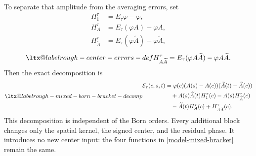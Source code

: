 \documentclass[a4paper,11pt]{article}
\makeatletter
\newcommand{\aliaslabel}[1]{\ltx@label{#1}}
\theoremstyle{plain}
\theoremstyle{definition}
\theoremstyle{remark}
\makeatother
\begin{document}
To separate that amplitude from the averaging errors, set
\begin{equation}\label{model-errors-def}
 \begin{aligned}
 H_1^\tau&=E_\tau\varphi-\varphi,\\
 H_A^\tau&=E_\tau(\varphi A)-\varphi A,\\
 H_{\widetilde A}^\tau&=E_\tau(\varphi\widetilde A)-\varphi\widetilde A,
 \end{aligned}
\end{equation}
\begin{equation}\label{model-product-error-def}\aliaslabel{rough-center-errors-def}
 H_{A\widetilde A}^\tau
 =E_\tau(\varphi A\widetilde A)-\varphi A\widetilde A.
\end{equation}
Then the exact decomposition is
\begin{equation}\label{model-mixed-bracket-decomp}\aliaslabel{rough-mixed-born-bracket-decomp}
\begin{aligned}
 \mathcal E_\tau(c,s,t)
 &=\varphi(c)(A(s)-A(c))(\widetilde A(t)-\widetilde A(c))\\
 &\quad+A(s)\widetilde A(t)H_1^\tau(c)
   -A(s)H_{\widetilde A}^\tau(c)\\
 &\quad-\widetilde A(t)H_A^\tau(c)+H_{A\widetilde A}^\tau(c).
\end{aligned}
\end{equation}
This decomposition is independent of the Born orders. Every additional block changes only the spatial kernel, the signed center, and the residual phase. It introduces no new center input: the four functions in \eqref{model-mixed-bracket} remain the same.
\end{document}
